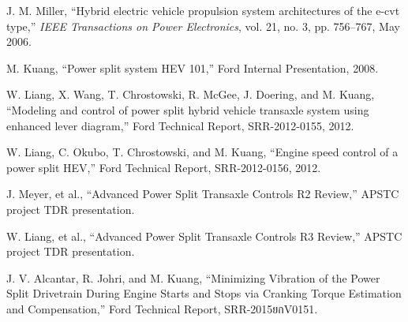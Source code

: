 \documentclass[11pt,letterpaper]{report}
\begin{document}


\begin{thebibliography}{199}



 J. M. Miller, ``Hybrid electric vehicle propulsion system
  architectures of the e-cvt type,'' {\it IEEE Transactions on Power
    Electronics}, vol. 21, no. 3, pp. 756--767, May 2006.

 M. Kuang, ``Power split system HEV 101,'' Ford
  Internal Presentation, 2008.


 W. Liang, X. Wang, T.
  Chrostowski, R. McGee, J. Doering, and M. Kuang, ``Modeling and control of power
  split hybrid vehicle transaxle system using enhanced lever diagram,''
  Ford Technical Report, SRR-2012-0155, 2012.

 W. Liang, C. Okubo, T. Chrostowski, and
  M. Kuang, ``Engine speed control of a power split HEV,'' Ford
  Technical Report, SRR-2012-0156, 2012.

 J. Meyer, et al., ``Advanced Power
  Split Transaxle Controls R2 Review,'' APSTC project TDR presentation. 


 W. Liang, et al., ``Advanced Power
  Split Transaxle Controls R3 Review,'' APSTC project TDR presentation. 

 J. V. Alcantar, R. Johri, and M. Kuang,
  ``Minimizing Vibration of the Power Split Drivetrain During Engine
  Starts and Stops via Cranking Torque Estimation and Compensation,''
  Ford Technical Report, SRR-2015ยกV0151.


\end{thebibliography}
\end{document}
